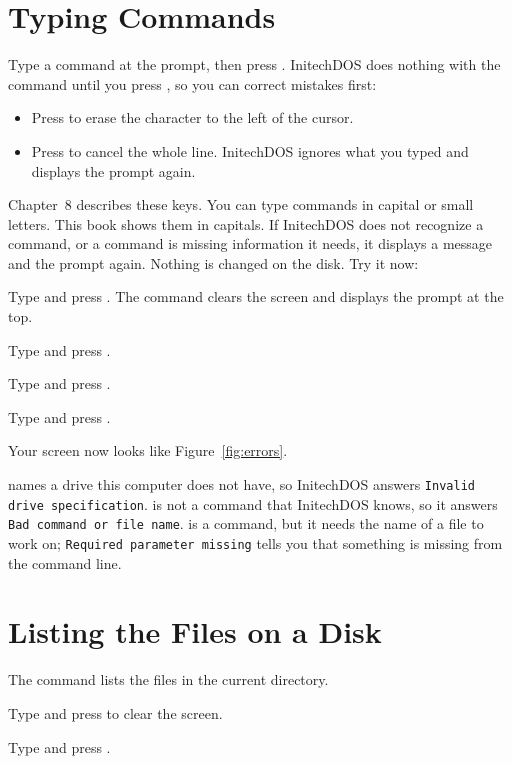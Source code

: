 \section{Typing Commands}
Type a command at the prompt, then press .  InitechDOS does
nothing with the command until you press , so you can correct
mistakes first:
\begin{itemize}
\item Press  to erase the character to the left of the
  cursor.
\item Press  to cancel the whole line.  InitechDOS ignores what
  you typed and displays the prompt again.
\end{itemize}
Chapter~8 describes these keys.  You can type commands in capital or small
letters.  This book shows them in capitals.  If InitechDOS does not
recognize a command, or a command is missing information it needs, it
displays a message and the prompt again.  Nothing is changed on the disk.
Try it now:
\begin{Steps}
\item Type  and press .  The %
   command clears the screen and displays the prompt
  at the top.
\item Type  and press .
\item Type  and press .
\item Type  and press .
\end{Steps}
Your screen now looks like Figure~\ref{fig:errors}.


 names a drive this computer does not have, so InitechDOS answers
\texttt{Invalid drive specification}.   is not a
command that InitechDOS knows, so it answers \texttt{Bad command or file
name}.   is a command, but it
needs the name of a file to work on; \texttt{Required parameter missing}
tells you that something is missing from the command line.

\section{Listing the Files on a Disk}
The  command lists the files in the current directory.
\begin{Steps}
\item Type  and press  to clear the screen.
\item Type  and press .
\end{Steps}

